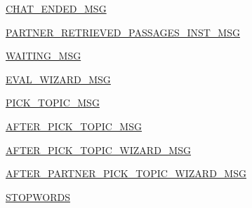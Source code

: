 \begin{DoxyCompactItemize}
\item 
\hyperlink{namespaceparlai_1_1mturk_1_1tasks_1_1wizard__of__wikipedia_1_1constants_a2f9cb4675a7b0aee21a0840521da248f}{C\+H\+A\+T\+\_\+\+E\+N\+D\+E\+D\+\_\+\+M\+SG}
\item 
\hyperlink{namespaceparlai_1_1mturk_1_1tasks_1_1wizard__of__wikipedia_1_1constants_af5d73d5c44feb6a1372b54e390838254}{P\+A\+R\+T\+N\+E\+R\+\_\+\+R\+E\+T\+R\+I\+E\+V\+E\+D\+\_\+\+P\+A\+S\+S\+A\+G\+E\+S\+\_\+\+I\+N\+S\+T\+\_\+\+M\+SG}
\item 
\hyperlink{namespaceparlai_1_1mturk_1_1tasks_1_1wizard__of__wikipedia_1_1constants_abc236ace341f567b9426ac91bfcc9fd9}{W\+A\+I\+T\+I\+N\+G\+\_\+\+M\+SG}
\item 
\hyperlink{namespaceparlai_1_1mturk_1_1tasks_1_1wizard__of__wikipedia_1_1constants_a1bb784ce62c369c4ce87f1c89aaea8d9}{E\+V\+A\+L\+\_\+\+W\+I\+Z\+A\+R\+D\+\_\+\+M\+SG}
\item 
\hyperlink{namespaceparlai_1_1mturk_1_1tasks_1_1wizard__of__wikipedia_1_1constants_a784262b7873ad49525c67d31183a407e}{P\+I\+C\+K\+\_\+\+T\+O\+P\+I\+C\+\_\+\+M\+SG}
\item 
\hyperlink{namespaceparlai_1_1mturk_1_1tasks_1_1wizard__of__wikipedia_1_1constants_a78d9dddd8f7689c40c7b4bc6c01dd233}{A\+F\+T\+E\+R\+\_\+\+P\+I\+C\+K\+\_\+\+T\+O\+P\+I\+C\+\_\+\+M\+SG}
\item 
\hyperlink{namespaceparlai_1_1mturk_1_1tasks_1_1wizard__of__wikipedia_1_1constants_ad53f67dc431b2625854e4610e44c156d}{A\+F\+T\+E\+R\+\_\+\+P\+I\+C\+K\+\_\+\+T\+O\+P\+I\+C\+\_\+\+W\+I\+Z\+A\+R\+D\+\_\+\+M\+SG}
\item 
\hyperlink{namespaceparlai_1_1mturk_1_1tasks_1_1wizard__of__wikipedia_1_1constants_a01cb068f10fb4018763f8f83e74dd11b}{A\+F\+T\+E\+R\+\_\+\+P\+A\+R\+T\+N\+E\+R\+\_\+\+P\+I\+C\+K\+\_\+\+T\+O\+P\+I\+C\+\_\+\+W\+I\+Z\+A\+R\+D\+\_\+\+M\+SG}
\item 
\hyperlink{namespaceparlai_1_1mturk_1_1tasks_1_1wizard__of__wikipedia_1_1constants_aa3b84e4db77b3228cd77bb2154c92b5c}{S\+T\+O\+P\+W\+O\+R\+DS}
\end{DoxyCompactItemize}


